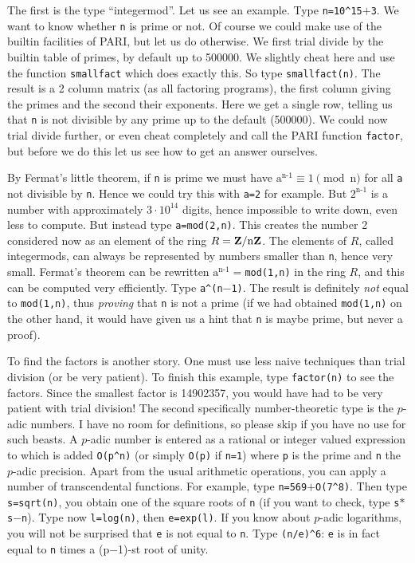The first is the type ``integermod''. Let us see an example. Type
{\tt n=10\^{}15$+$3}. We want to know whether {\tt n} is prime or not. Of course
we could make use of the builtin facilities of PARI, but let us do otherwise.
We first trial divide by the builtin table of primes, by default up to
500000. We slightly cheat here and use the function {\tt smallfact} which
does exactly this. So type {\tt smallfact(n)}. The result is a 2 column
matrix (as all factoring programs), the first column giving the primes and
the second their exponents. Here we get a single row, telling us that {\tt n}
is not divisible by any prime up to the default (500000). We could now
trial divide further, or even cheat completely and call the PARI function
{\tt factor}, but before we do this let us see how to get an answer ourselves.

By Fermat's little theorem, if {\tt n} is prime we must have 
$\text{a}^{\text{n-1}}\equiv1\pmod{\text{n}}$ for all {\tt a} not divisible by
{\tt n}. Hence we could try this with {\tt a=2} for example. But 
$2^{\text{n-1}}$ is a number with approximately $3\cdot10^{14}$ digits, hence
impossible to write down, even less to compute. But instead type
{\tt a=mod(2,n)}. This creates the number 2 considered now as an element of
the ring $R={\bf Z}/{\rm n}{\bf Z}$. The elements of $R$, called integermods, can
always be represented by numbers smaller than {\tt n}, hence very small.
Fermat's theorem can be rewritten {\tt $\text{a}^{\text{n-1}}=$mod(1,n)} in
the ring $R$, and this can be computed very efficiently. Type
{\tt a\^{}(n$-$1)}. The result is definitely {\sl not\/} equal to {\tt mod(1,n)},
thus {\sl proving\/} that {\tt n} is not a prime (if we had obtained 
{\tt mod(1,n)} on the other hand, it would have given us a hint that {\tt n}
is maybe prime, but never a proof).

To find the factors is another story. One must use less naive techniques than
trial division (or be very patient). To finish this example, type 
{\tt factor(n)} to see the factors. Since the smallest factor is 14902357,
you would have had to be very patient with trial division!
\smallskip
The second specifically number-theoretic type is the $p$-adic numbers. I have
no room for definitions, so please skip if you have no use for such beasts.
A $p$-adic number is entered as a rational or integer valued expression to which
is added {\tt O(p\^{}n)} (or simply {\tt O(p)} if {\tt n=1}) where {\tt p} is
the prime and {\tt n} the $p$-adic precision. Apart from the usual arithmetic
operations, you can apply a number of transcendental functions.
For example, type {\tt n=569$+$O(7\^{}8)}. Then type {\tt s=sqrt(n)}, you
obtain one of the square roots of {\tt n} (if you want to check, type 
{\tt s$*$s$-$n}). Type now {\tt l=log(n)}, then {\tt e=exp(l)}. If you
know about $p$-adic logarithms, you will not be surprised that {\tt e} is not
equal to {\tt n}. Type {\tt (n/e)\^{}6}: {\tt e} is in fact equal to {\tt n}
times a (p$-$1)-st root of unity.

